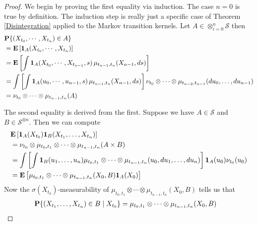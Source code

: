 \begin{proof}
We begin by proving the first equality via induction.  The case $n=0$
is true by definition.  The induction step is 
really just a specific case of Theorem 
\ref{Disintegration} applied to the Markov transition kernels.  Let $A
\in \otimes_{i=0}^n \mathcal{S}$ then 
\begin{align*}
&\probability{(X_{t_0}, \cdots, X_{t_n}) \in A} \\
&=\expectation{\characteristic{A}(X_{t_0}, \cdots, X_{t_n})} \\
&=\expectation{\int \characteristic{A}(X_{t_0}, \cdots, X_{t_{n-1}},s)
  \, \mu_{t_{n-1}, t_n} (X_{n-1}, ds)} \\
&=\int \left [ \int \characteristic{A}(u_0, \cdots,u_{n-1}, s)   \,
  \mu_{t_{n-1}, t_n} (X_{n-1}, ds) \right ] \nu_{t_0} \otimes \cdots \otimes
  \mu_{t_{n-2}, t_{n-1}}(du_0, \dotsc, du_{n-1})\\
&=\nu_{t_0} \otimes \cdots \otimes  \mu_{t_{n-1}, t_{n}}(A)
\end{align*}

The second equality is derived from the first.  Suppose we have $A \in
\mathcal{S}$ and $B \in \mathcal{S}^{\otimes n}$.  Then we can compute
\begin{align*}
&\expectation{\characteristic{A}(X_{t_0}) \characteristic{B}(X_{t_1},
  \dotsc, X_{t_n})}  \\
&= \nu_{t_0} \otimes \mu_{t_0, t_1} \otimes \cdots \otimes  \mu_{t_{n-1},
  t_{n}}(A \times B) \\
&= \int \left [ \int \characteristic{B}(u_1, \dotsc, u_n) \mu_{t_0,
    t_1} \otimes \cdots \otimes \mu_{t_{n-1}, t_n} (u_0, du_1, \dotsc, du_n) \right ]
\characteristic{A}(u_0) \nu_{t_0}(u_0) \\
&=\expectation{\mu_{t_0, t_1} \otimes \cdots \otimes \mu_{t_{n-1},
    t_n}(X_0, B) \characteristic{A}(X_0)}
\end{align*}
Now the $\sigma(X_{t_0})$-measurability of $\mu_{t_0, t_1} \otimes \cdots \otimes \mu_{t_{n-1},
    t_n}(X_0, B)$ tells us that 
\begin{align*}
\cprobability{X_{t_0}}{(X_{t_1},\dotsc, X_{t_n}) \in B} 
&= \mu_{t_0, t_1} \otimes \cdots \otimes \mu_{t_{n-1},    t_n}(X_0, B)
\end{align*}


\end{proof}
